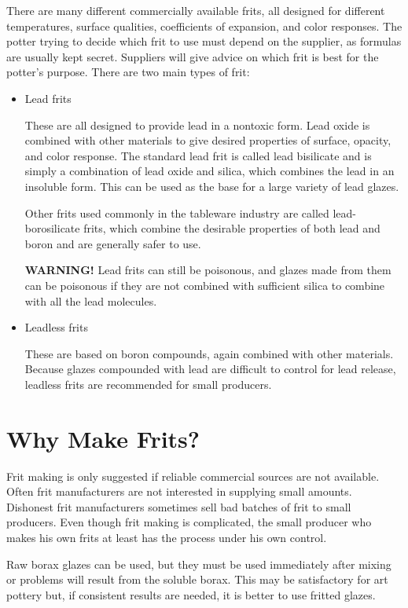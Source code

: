 There are many different commercially available frits, all designed for 
different temperatures, surface qualities, coefficients of expansion, and color 
responses. The potter trying to decide which frit to use must depend on the 
supplier, as formulas are usually kept secret. Suppliers will give advice on 
which frit is best for the potter's purpose. There are two main types of frit:
\begin{itemize}
\item Lead frits

These are all designed to provide lead in a nontoxic form. Lead oxide is 
combined with other materials to give desired properties of surface, opacity, 
and color response. The standard lead frit is called lead bisilicate and is 
simply a combination of lead oxide and silica, which combines the lead in an 
insoluble form. This can be used as the base for a large variety of lead glazes.

Other frits used commonly in the tableware industry are called 
lead-borosilicate frits, which combine the desirable properties of both lead 
and boron and are generally safer to use.

\textbf{WARNING!} Lead frits can still be poisonous, and glazes made from them 
can be poisonous if they are not combined with sufficient silica to combine 
with all the lead molecules.

\item Leadless frits

These are based on boron compounds, again combined with other materials. 
Because glazes compounded with lead are difficult to control for lead release, 
leadless frits are recommended for small producers.
\end{itemize}
\section{Why Make Frits?}
Frit making is only suggested if reliable commercial sources are not available. 
Often frit manufacturers are not interested in supplying small amounts. 
Dishonest frit manufacturers sometimes sell bad batches of frit to small 
producers. Even though frit making is complicated, the small producer who makes 
his own frits at least has the process under his own control.

Raw borax glazes can be used, but they must be used immediately after mixing or 
problems will result from the soluble borax. This may be satisfactory for art 
pottery but, if consistent results are needed, it is better to use fritted 
glazes.

